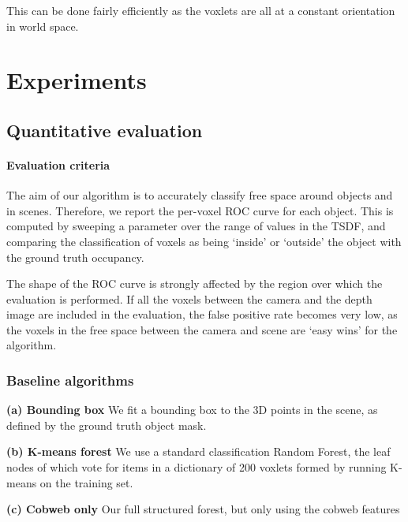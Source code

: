 \documentclass[10pt,twocolumn,letterpaper]{article}
\begin{document}
This can be done fairly efficiently as the voxlets are all at a constant orientation in world space.


\section{Experiments}


\subsection{Quantitative evaluation}

\paragraph{Evaluation criteria}
The aim of our algorithm is to accurately classify free space around objects and in scenes.
Therefore, we report the per-voxel ROC curve for each object.
This is computed by sweeping a parameter over the range of values in the TSDF, and comparing the classification of voxels as being `inside' or `outside' the object with the ground truth occupancy.

The shape of the ROC curve is strongly affected by the region over which the evaluation is performed.
If all the voxels between the camera and the depth image are included in the evaluation, the false positive rate becomes very low, as the voxels in the free space between the camera and scene are `easy wins' for the algorithm. 


\subsubsection{Baseline algorithms}

\noindent \textbf{(a) Bounding box} We fit a bounding box to the 3D points in the scene, as defined by the ground truth object mask.

\noindent \textbf{(b) K-means forest} We use a standard classification Random Forest, the leaf nodes of which vote for items in a dictionary of 200 voxlets formed by running K-means on the training set.

\noindent \textbf{(c) Cobweb only} Our full structured forest, but only using the cobweb features
\end{document}
